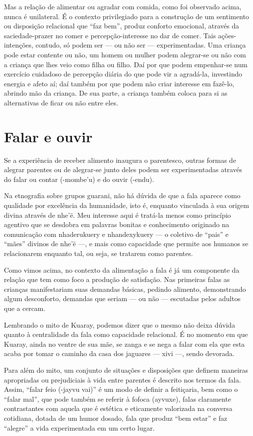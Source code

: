 Mas a relação de alimentar ou agradar com comida, como foi observado
acima, nunca é unilateral. É o contexto privilegiado para a construção
de um sentimento ou disposição relacional que ``faz bem'', produz
conforto emocional, através da saciedade-prazer no comer e
percepção-interesse no dar de comer. Tais ações-intenções, contudo, só
podem ser — ou não ser — experimentadas. Uma criança pode estar
contente ou não, um homem ou mulher podem alegrar-se ou não com a
criança que lhes veio como filha ou filho. Daí por que podem
empenhar-se num exercício cuidadoso de percepção diária do que pode vir
a agradá-la, investindo energia e afeto aí; daí também por que podem
não criar interesse em fazê-lo, abrindo mão da criança. De sua parte, a
criança também coloca para si as alternativas de ficar ou não entre
eles. 

\section{Falar e ouvir}

Se a experiência de receber alimento inaugura o parentesco, outras
formas de alegrar parentes ou de alegrar-se junto deles podem ser
experimentadas através do falar ou contar (-mombe’u) e do ouvir
(-endu).

Na etnografia sobre grupos guarani, não há dúvida de que a fala aparece
como qualidade por excelência da humanidade, isto é, enquanto vinculada
à sua origem divina através de nhe’ë. Meu interesse aqui é tratá-la
menos como princípio agentivo que se desdobra em palavras bonitas e
conhecimento originado na comunicação com nhaderukuery e nhandexykuery
— o coletivo de ``pais'' e ``mães'' divinos de nhe’ë —, e mais como
capacidade que permite aos humanos se relacionarem enquanto tal, ou
seja, se tratarem como parentes.

Como vimos acima, no contexto da alimentação a fala é já um componente
da relação que tem como foco a produção de satisfação. Nas primeiras
falas as crianças manifestariam suas demandas básicas, pedindo
alimento, demonstrando algum desconforto, demandas que seriam — ou não
— escutadas pelos adultos que a cercam. 

Lembrando o mito de Kuaray, podemos dizer que o mesmo não deixa dúvida
quanto à centralidade da fala como capacidade relacional. É no momento
em que Kuaray, ainda no ventre de sua mãe, se zanga e se nega a falar
com ela que esta acaba por tomar o caminho da casa dos jaguares — xivi
—, sendo devorada.

Para além do mito, um conjunto de situações e disposições que definem
maneiras apropriadas ou prejudiciais à vida entre parentes é descrito
nos termos da fala. Assim, ``falar feio (-jayvu vai)'' é um modo de
definir a feitiçaria, bem como o ``falar mal'', que pode também se
referir à fofoca (ayvuxe), falas claramente contrastantes com aquela
que é estética e eticamente valorizada na conversa cotidiana, dotada de
um humor dosado, fala que produz ``bem estar'' e faz ``alegre'' a vida
experimentada em um certo lugar.

